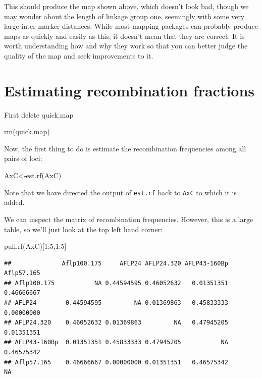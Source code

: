 \documentclass[
]{book}
\newenvironment{Shaded}{\begin{snugshade}}{\end{snugshade}}
\newcommand{\DecValTok}[1]{\textcolor[rgb]{0.00,0.00,0.81}{#1}}
\newcommand{\FunctionTok}[1]{\textcolor[rgb]{0.00,0.00,0.00}{#1}}
\newcommand{\NormalTok}[1]{#1}
\newcommand{\OtherTok}[1]{\textcolor[rgb]{0.56,0.35,0.01}{#1}}
\newcommand{\SpecialCharTok}[1]{\textcolor[rgb]{0.00,0.00,0.00}{#1}}
\begin{document}
This should produce the map shown above, which doesn't look bad, though we may wonder about the length of linkage group one, seemingly with some very large inter marker distances. While most mapping packages can probably produce maps as quickly and easily as this, it doesn't mean that they are correct. It is worth understanding how and why they work so that you can better judge the quality of the map and seek improvements to it.

\hypertarget{estimating-recombination-fractions}{%
\section{Estimating recombination fractions}\label{estimating-recombination-fractions}}

First delete quick.map

\begin{Shaded}
\begin{Highlighting}[]
\FunctionTok{rm}\NormalTok{(quick.map) }
\end{Highlighting}
\end{Shaded}

Now, the first thing to do is estimate the recombination frequencies among all pairs of loci:

\begin{Shaded}
\begin{Highlighting}[]
\NormalTok{AxC}\OtherTok{\textless{}{-}}\FunctionTok{est.rf}\NormalTok{(AxC) }
\end{Highlighting}
\end{Shaded}

Note that we have directed the output of \texttt{est.rf} back to \texttt{AxC} to which it is added.

We can inspect the matrix of recombination frequencies. However, this is a large table, so we'll just look at the top left hand corner:

\begin{Shaded}
\begin{Highlighting}[]
\FunctionTok{pull.rf}\NormalTok{(AxC)[}\DecValTok{1}\SpecialCharTok{:}\DecValTok{5}\NormalTok{,}\DecValTok{1}\SpecialCharTok{:}\DecValTok{5}\NormalTok{] }
\end{Highlighting}
\end{Shaded}

\begin{verbatim}
##              Aflp100.175     AFLP24 AFLP24.320 AFLP43-160Bp Aflp57.165
## Aflp100.175           NA 0.44594595 0.46052632   0.01351351 0.46666667
## AFLP24        0.44594595         NA 0.01369863   0.45833333 0.00000000
## AFLP24.320    0.46052632 0.01369863         NA   0.47945205 0.01351351
## AFLP43-160Bp  0.01351351 0.45833333 0.47945205           NA 0.46575342
## Aflp57.165    0.46666667 0.00000000 0.01351351   0.46575342         NA
\end{verbatim}
\end{document}
